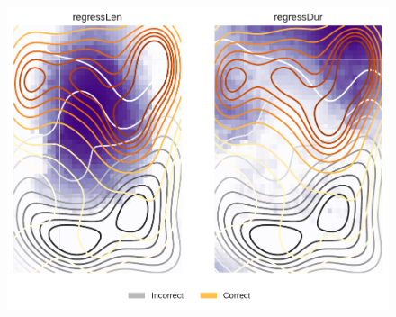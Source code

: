 \documentclass[10pt]{beamer}
\begin{document}
\begin{frame}{}
\begin{figure}
    \centering
    \includegraphics[height=\textheight]{eye_regress-eps-converted-to.pdf}
\end{figure}
\end{frame}
\end{document}

